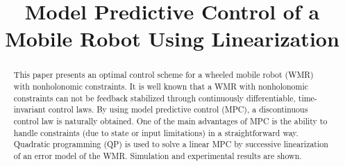 \documentclass[conference]{IEEEtran} %
\begin{document}
\title{Model Predictive Control of a Mobile Robot Using Linearization}

\author{
}

\maketitle

\begin{abstract}
This paper presents an optimal control scheme for a wheeled mobile robot (WMR) with nonholonomic constraints. It is well known that a WMR with nonholonomic constraints can not be feedback stabilized through continuously differentiable, time-invariant control laws. By using model predictive control (MPC), a discontinuous control law is naturally obtained. One of the main advantages of MPC is the ability to handle constraints (due to state or input limitations) in a straightforward way. Quadratic programming (QP) is used to solve a linear MPC by successive linearization of an error model of the WMR. Simulation and experimental results are shown.
\end{abstract}
\end{document}
